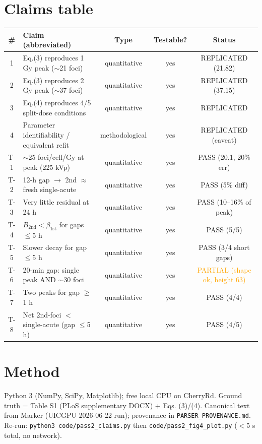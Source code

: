 \documentclass[11pt]{article}
\begin{document}
\section{Claims table}
\begin{longtable}{clccc}
\toprule
\# & Claim (abbreviated) & Type & Testable? & Status \\
\midrule\endhead
1 & Eq.(3) reproduces 1 Gy peak ($\sim$21 foci) & quantitative & yes & REPLICATED (21.82) \\
2 & Eq.(3) reproduces 2 Gy peak ($\sim$37 foci) & quantitative & yes & REPLICATED (37.15) \\
3 & Eq.(4) reproduces 4/5 split-dose conditions & quantitative & yes & REPLICATED \\
4 & Parameter identifiability / equivalent refit & methodological & yes & REPLICATED (caveat) \\
T-1 & $\sim$25 foci/cell/Gy at peak (225 kVp) & quantitative & yes & PASS (20.1, 20\% err) \\
T-2 & 12-h gap $\to$ 2nd $\approx$ fresh single-acute & quantitative & yes & PASS (5\% diff) \\
T-3 & Very little residual at 24 h & quantitative & yes & PASS (10--16\% of peak) \\
T-4 & $B_{\text{2nd}} < \beta_{\text{1st}}$ for gaps $\le$5 h & quantitative & yes & PASS (5/5) \\
T-5 & Slower decay for gap $\le$5 h & quantitative & yes & PASS (3/4 short gaps) \\
T-6 & 20-min gap: single peak AND $\sim$30 foci & quantitative & yes & \textcolor{orange}{PARTIAL (shape ok, height 63)} \\
T-7 & Two peaks for gap $\ge$1 h & quantitative & yes & PASS (4/4) \\
T-8 & Net 2nd-foci $<$ single-acute (gap $\le$5 h) & quantitative & yes & PASS (4/5) \\
\bottomrule
\end{longtable}

\section{Method}
Python 3 (NumPy, SciPy, Matplotlib); free local CPU on CherryRd. Ground truth =
Table S1 (PLoS supplementary DOCX) + Eqs. (3)/(4). Canonical text from Marker
(UICGPU 2026-06-22 run); provenance in \texttt{PARSER\_PROVENANCE.md}.
Re-run: \texttt{python3 code/pass2\_claims.py} then \texttt{code/pass2\_fig4\_plot.py}
($<$5 s total, no network).
\end{document}
